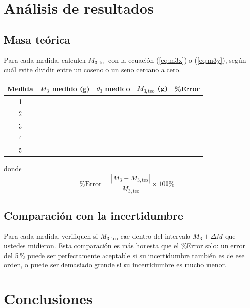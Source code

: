 \documentclass[11pt, letterpaper]{article}
\begin{document}
	\section{Análisis de resultados}
	
	\subsection{Masa teórica}
	
	Para cada medida, calculen $M_{3,\text{teo}}$ con la ecuación
	(\ref{eq:m3x}) o (\ref{eq:m3y}), según cuál evite dividir entre un coseno o
	un seno cercano a cero.
	
	\begin{center}
		\small
		\begin{tabular}{|c|c|c|c|c|}
			\hline
			Medida & $M_3$ medido (g) & $\theta_3$ medido
			& $M_{3,\text{teo}}$ (g) & \%Error \\
			\hline
			\rule{0pt}{3ex} 1 & & & & \\ \hline
			\rule{0pt}{3ex} 2 & & & & \\ \hline
			\rule{0pt}{3ex} 3 & & & & \\ \hline
			\rule{0pt}{3ex} 4 & & & & \\ \hline
			\rule{0pt}{3ex} 5 & & & & \\ \hline
		\end{tabular}
	\end{center}
	
	\noindent
	donde
	\[
	\%\text{Error} = \frac{|M_3 - M_{3,\text{teo}}|}{M_{3,\text{teo}}}
	\times 100\%
	\]
	
	\subsection{Comparación con la incertidumbre}
	
	Para cada medida, verifiquen si $M_{3,\text{teo}}$ cae dentro del intervalo
	$M_3 \pm \Delta M$ que ustedes midieron. Esta comparación es más honesta
	que el \%Error solo: un error del 5\,\% puede ser perfectamente aceptable
	si su incertidumbre también es de ese orden, o puede ser demasiado grande
	si su incertidumbre es mucho menor.
	
	\section{Conclusiones}
	
\end{document}
